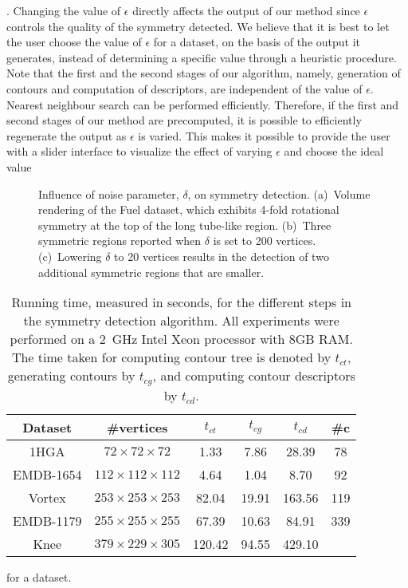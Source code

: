 \documentclass[review,journal]{vgtc}         %
\begin{document}
.
Changing the value of $\epsilon$ directly affects the output of  our method since $\epsilon$
controls the quality of the symmetry detected. We believe that it is best to let the user choose the value
of $\epsilon$ for a dataset, on the basis of the output it generates, instead of determining a specific
value through a heuristic procedure. Note that the first and the second stages of our algorithm,
namely, generation of contours and computation of descriptors, are independent of the value of 
$\epsilon$. Nearest neighbour search can be performed efficiently. Therefore, if the first and 
second stages of our method are precomputed, it is possible to efficiently regenerate the output
as $\epsilon$ is varied. This makes it possible to provide the user with a slider interface
to visualize the effect of varying $\epsilon$ and choose the ideal value 
\begin{figure}[t]
	\centering
	\caption{\label{delta}Influence of noise parameter, $\delta$, on symmetry detection. (a)~Volume rendering of 
		the Fuel dataset, which exhibits 4-fold rotational symmetry at the top of the long tube-like region.
		(b)~Three symmetric regions reported when $\delta$ is set to 200 vertices. (c)~Lowering
	$\delta$ to 20 vertices results in the detection of two additional symmetric regions that are smaller.}
\end{figure}
\begin{table}[b]
\centering
{\small
\caption{Running time, measured in seconds, for the different steps in the symmetry detection algorithm.
	All experiments were performed on a 2~GHz Intel Xeon processor with 8GB RAM. The time taken for
	computing contour tree is denoted by $t_{ct}$, generating contours by $t_{cg}$, and computing contour descriptors
	by $t_{cd}$.}
\label{exp-table}
\begin{tabular}{c||c|c|c|c|c}
Dataset		& \#vertices 			& $t_{ct}$	& $t_{cg}$	& $t_{cd}$	&  \#c\\%
\hline
1HGA	 	& $72\times72\times72$ 		& 1.33 		& 7.86 		&  28.39       	& 78\\%
EMDB-1654 	& $112\times112\times112$ 	& 4.64 		& 1.04		&  8.70      	& 92\\%
Vortex		& $253\times253\times253$	& 82.04	 	& 19.91		&  163.56	& 119	\\
EMDB-1179 	& $255\times255\times255$ 	& 67.39		& 10.63		&  84.91     	& 339\\%
Knee 		& $379\times229\times305$ 	& 120.42	& 94.55		& 429.10	&	%
\end{tabular}
}
\end{table}
for a dataset.
\end{document}
